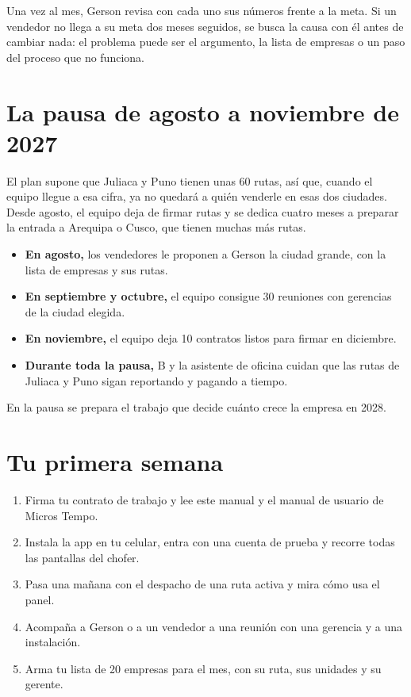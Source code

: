 \documentclass[a4paper]{article}
\begin{document}
Una vez al mes, Gerson revisa con cada uno sus números frente a la meta. Si un vendedor no llega a su meta dos meses seguidos, se busca la causa con él antes de cambiar nada: el problema puede ser el argumento, la lista de empresas o un paso del proceso que no funciona.

\section{La pausa de agosto a noviembre de 2027}

El plan supone que Juliaca y Puno tienen unas 60 rutas, así que, cuando el equipo llegue a esa cifra, ya no quedará a quién venderle en esas dos ciudades. Desde agosto, el equipo deja de firmar rutas y se dedica cuatro meses a preparar la entrada a Arequipa o Cusco, que tienen muchas más rutas.

\begin{itemize}
\item \textbf{En agosto,} los vendedores le proponen a Gerson la ciudad grande, con la lista de empresas y sus rutas.
\item \textbf{En septiembre y octubre,} el equipo consigue 30 reuniones con gerencias de la ciudad elegida.
\item \textbf{En noviembre,} el equipo deja 10 contratos listos para firmar en diciembre.
\item \textbf{Durante toda la pausa,} B y la asistente de oficina cuidan que las rutas de Juliaca y Puno sigan reportando y pagando a tiempo.
\end{itemize}

En la pausa se prepara el trabajo que decide cuánto crece la empresa en 2028.

\section{Tu primera semana}

\begin{enumerate}[label=\textbf{Día \arabic*.}, leftmargin=40pt]
\item Firma tu contrato de trabajo y lee este manual y el manual de usuario de Micros Tempo.
\item Instala la app en tu celular, entra con una cuenta de prueba y recorre todas las pantallas del chofer.
\item Pasa una mañana con el despacho de una ruta activa y mira cómo usa el panel.
\item Acompaña a Gerson o a un vendedor a una reunión con una gerencia y a una instalación.
\item Arma tu lista de 20 empresas para el mes, con su ruta, sus unidades y su gerente.
\end{enumerate}
\end{document}
